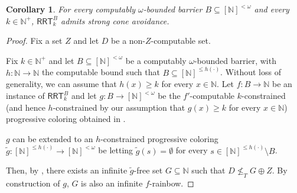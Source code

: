 \documentclass{article}
\newcommand{\RRT}[0]{\mathsf{RRT}}
\newcommand{\NN}[0]{\mathbb{N}}
\newcommand{\card}{\operatorname{card}}
\newcommand{\lex}{\mathrm{lex}}
\numberwithin{theorem}{section}
\newtheorem{proposition}[theorem]{Proposition}
\newtheorem{corollary}[theorem]{Corollary}
\newcommand{\ludovic}[1]{\textcolor{blue}{#1}}
\begin{document}


\bigskip


\begin{corollary}
For every computably $\omega$-bounded barrier $B \subseteq [\NN]^{<\omega}$ and every~$k \in \NN^+$, $\RRT^B_k$ admits strong cone avoidance. 
\end{corollary}
\begin{proof}
Fix a set $Z$ and let $D$ be a non-$Z$-computable set.

Fix $k \in \NN^+$ and let $B \subseteq [\NN]^{<\omega}$ be a computably $\omega$-bounded barrier, with $h : \NN \to \NN$ the computable bound such that $B \subseteq [\NN]^{\leq h(\cdot)}$. Without loss of generality, we can assume that $h(x) \geq k$ for every $x \in \NN$. Let $f : B \to \NN$ be an instance of $\RRT^{B}_k$ and let $g : B \to [\NN]^{<\omega}$ be the $f'$-computable $k$-constrained (and hence $h$-constrained by our assumption that $g(x) \geq k$ for every $x \in \NN$) progressive coloring obtained in . 

$g$ can be extended to an $h$-constrained progressive coloring $\tilde{g} : [\NN]^{\leq h(\cdot)} \to [\NN]^{<\omega}$ be letting $\tilde{g}(s) = \emptyset$ for every $s \in  [\NN]^{\leq h(\cdot)} \setminus B$.

Then, by , there exists an infinite $\tilde{g}$-free set $G \subseteq \NN$ such that $D \not \leq_T G \oplus Z$. By construction of $g$, $G$ is also an infinite $f$-rainbow.
\end{proof}
\end{document}
